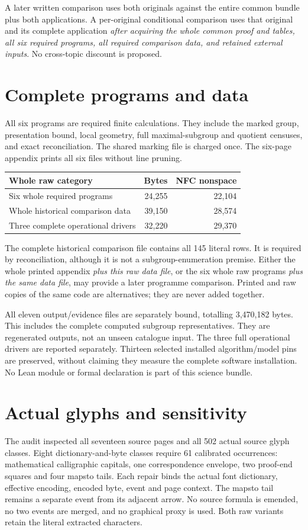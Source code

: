 \documentclass[11pt,a4paper]{article}
\begin{document}
 A later written comparison uses both originals against the entire common
 bundle plus both applications. A per-original conditional comparison uses
 that original and its complete application \emph{after acquiring the whole
 common proof and tables, all six required programs, all required comparison
 data, and retained external inputs}. No cross-topic discount is proposed.

 \section*{Complete programs and data}
 All six programs are required finite calculations. They include the marked
 group, presentation bound, local geometry, full maximal-subgroup and quotient
 censuses, and exact reconciliation. The shared marking file is charged once.
 The six-page appendix prints all six files without line pruning.

 \begin{center}\small
 \begin{tabular}{p{79mm}rr}\toprule
 Whole raw category & Bytes & NFC nonspace\\\midrule
 Six whole required programs & 24,255 & 22,104\\
Whole historical comparison data & 39,150 & 28,574\\
Three complete operational drivers & 32,220 & 29,370\\
 \bottomrule\end{tabular}\end{center}
 The complete historical comparison file contains all 145 literal rows. It is
 required by reconciliation, although it is not a subgroup-enumeration
 premise. Either the whole printed appendix \emph{plus this raw data file},
 or the six whole raw programs \emph{plus the same data file}, may provide a
 later programme comparison. Printed and raw copies of the same code are
 alternatives; they are never added together.

 All eleven output/evidence files are separately bound, totalling 3,470,182
 bytes. This includes the complete computed subgroup representatives. They
 are regenerated outputs, not an unseen catalogue input. The three full
 operational drivers are reported separately. Thirteen selected installed
 algorithm/model pins are preserved, without claiming they measure the
 complete software installation. No Lean module or formal declaration is
 part of this science bundle.

 \section*{Actual glyphs and sensitivity}
 The audit inspected all seventeen source pages and all 502 actual source
 glyph classes. Eight dictionary-and-byte classes require 61 calibrated
 occurrences: mathematical calligraphic capitals, one correspondence envelope,
 two proof-end squares and four mapsto tails. Each repair binds the actual
 font dictionary, effective encoding, encoded byte, event and page context.
 The mapsto tail remains a separate event from its adjacent arrow. No source
 formula is emended, no two events are merged, and no graphical proxy is used.
 Both raw variants retain the literal extracted characters.
\end{document}
